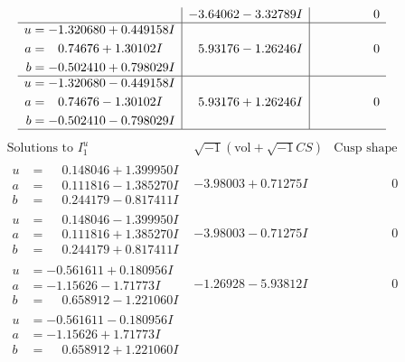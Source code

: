 \documentclass[1p]{elsarticle_modified}
\theoremstyle{definition}
\newcommand{\I}{\sqrt{-1}}
\begin{document}
$$\begin{array}{c|c|c}
 & -3.64062 - 3.32789 I & \phantom{-0.000000 } 0 \\ \hline\begin{aligned}
u &= -1.320680 + 0.449158 I \\
a &= \phantom{-}0.74676 + 1.30102 I \\
b &= -0.502410 + 0.798029 I\end{aligned}
 & \phantom{-}5.93176 - 1.26246 I & \phantom{-0.000000 } 0 \\ \hline\begin{aligned}
u &= -1.320680 - 0.449158 I \\
a &= \phantom{-}0.74676 - 1.30102 I \\
b &= -0.502410 - 0.798029 I\end{aligned}
 & \phantom{-}5.93176 + 1.26246 I & \phantom{-0.000000 } 0\\
 \hline 
 \end{array}$$\newpage$$\begin{array}{c|c|c}  
\text{Solutions to }I^u_{1}& \I (\text{vol} + \sqrt{-1}CS) & \text{Cusp shape}\\
 \hline 
\begin{aligned}
u &= \phantom{-}0.148046 + 1.399950 I \\
a &= \phantom{-}0.111816 - 1.385270 I \\
b &= \phantom{-}0.244179 - 0.817411 I\end{aligned}
 & -3.98003 + 0.71275 I & \phantom{-0.000000 } 0 \\ \hline\begin{aligned}
u &= \phantom{-}0.148046 - 1.399950 I \\
a &= \phantom{-}0.111816 + 1.385270 I \\
b &= \phantom{-}0.244179 + 0.817411 I\end{aligned}
 & -3.98003 - 0.71275 I & \phantom{-0.000000 } 0 \\ \hline\begin{aligned}
u &= -0.561611 + 0.180956 I \\
a &= -1.15626 - 1.71773 I \\
b &= \phantom{-}0.658912 - 1.221060 I\end{aligned}
 & -1.26928 - 5.93812 I & \phantom{-0.000000 } 0 \\ \hline\begin{aligned}
u &= -0.561611 - 0.180956 I \\
a &= -1.15626 + 1.71773 I \\
b &= \phantom{-}0.658912 + 1.221060 I\end{aligned}

\end{array}$$
\end{document}
